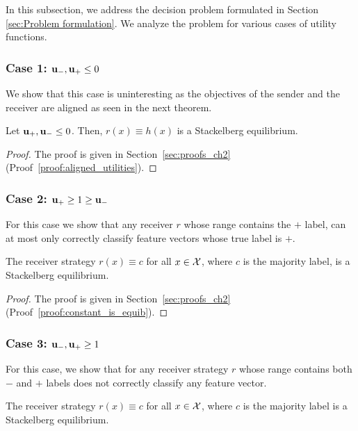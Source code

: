 In this subsection, we address the decision problem formulated in Section \ref{sec:Problem formulation}. We analyze the problem for various cases of utility functions.\\

\subsubsection{Case 1: $\mathbf{u_-}, \mathbf{u_+} \leq 0$}
We show that this case is uninteresting as the objectives of the sender and the receiver are aligned as seen in the next theorem.


\begin{thm}\label{thm:aligned_utilities} Let $\mathbf{u_+},\mathbf{u_-} \leq 0$. Then,
$r(x) \equiv h(x)$ is a Stackelberg equilibrium.
\end{thm}
\begin{proof} The proof is given in Section~\ref{sec:proofs_ch2} (Proof~\ref{proof:aligned_utilities}).
\end{proof}


\subsubsection{Case 2: $\mathbf{u_+} \geq 1 \geq \mathbf{u_-}$}

For this case we show that any receiver $r$ whose range contains the $\plus$ label, can at most only correctly classify  feature vectors whose true label is $\plus$.



\begin{thm}\label{prop:constant is equib}
The receiver strategy $r(x) \equiv c$ for all $x \in \mathcal{X}$, where $c$ is the majority label, is a Stackelberg equilibrium.
\end{thm}

\begin{proof} The proof is given in Section~\ref{sec:proofs_ch2} (Proof~\ref{proof:constant_is_equib}).
\end{proof}


\subsubsection{Case 3: $\mathbf{u_-}, \mathbf{u_+} \geq 1$}
For this case, we show that for any receiver strategy $r$ whose range contains both $\minus$ and $\plus$ labels does not correctly classify any feature vector.

\begin{thm}\label{thm:large_utilities}
The receiver strategy $r(x) \equiv c$ for all $x \in \mathcal{X}$, where $c$ is the majority label is a Stackelberg equilibrium.
\end{thm}

